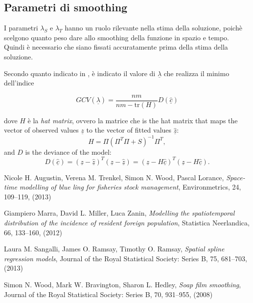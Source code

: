 \documentclass[a4paper,11pt,twoside,openright]{book}							%
\begin{document}
\subsection*{Parametri di smoothing}
I parametri $\lambda_S$ e $\lambda_T$ hanno un ruolo rilevante nella stima della soluzione, poichè scelgono quanto peso dare allo smoothing della funzione in spazio e tempo. Quindi è necessario che siano fissati accuratamente prima della stima della soluzione.

Secondo quanto indicato in \cite{art:marra}, è indicato il valore di $\underline \lambda$ che realizza
il minimo dell'indice 

$$ GCV(\underline \lambda) =\frac{nm}{nm-\text{tr}(H)}  D(\hat  {\underline c}) $$

dove $H$ è la \textit{hat matrix}, ovvero la matrice che is the hat matrix that maps the vector of observed values $\underline z$ to the vector of fitted values $\hat  {\underline z}$:
$$ H = \Pi (\Pi^T \Pi + S)^{-1}\Pi^T ,$$
and $D$ is the deviance of the model:
$$  D(\hat  {\underline c}) = (\underline z - \hat  {\underline z})^T(\underline z - \hat  {\underline z}) = (\underline z - H \hat  {\underline c})^T(\underline z - H \hat  {\underline c}).$$


\begin{thebibliography}{9}

Nicole H. Augustin, Verena M. Trenkel, Simon N. Wood, Pascal Lorance, \emph{Space-time modelling of blue ling for fisheries stock management}, Environmetrics, 24, 109–119, (2013)

Giampiero Marra, David L. Miller, Luca Zanin, \emph{Modelling the spatiotemporal distribution of the incidence of resident foreign population}, Statistica Neerlandica, 66, 133–160, (2012)

Laura M. Sangalli, James O. Ramsay, Timothy O. Ramsay, \emph{Spatial spline regression models}, Journal of the Royal Statistical Society: Series B, 75, 681–703, (2013)

Simon N. Wood, Mark W. Bravington, Sharon L. Hedley, \emph{Soap film smoothing}, Journal of the Royal Statistical Society: Series B, 70, 931–955, (2008)



\end{thebibliography}
\end{document}
